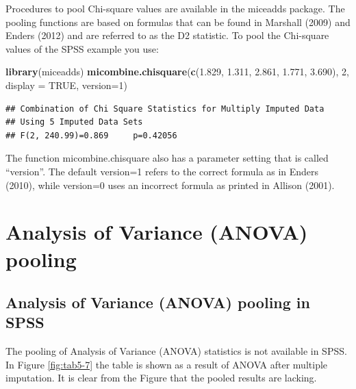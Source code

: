 \documentclass[]{book}
\newenvironment{Shaded}{\begin{snugshade}}{\end{snugshade}}
\newcommand{\KeywordTok}[1]{\textcolor[rgb]{0.13,0.29,0.53}{\textbf{#1}}}
\newcommand{\DataTypeTok}[1]{\textcolor[rgb]{0.13,0.29,0.53}{#1}}
\newcommand{\DecValTok}[1]{\textcolor[rgb]{0.00,0.00,0.81}{#1}}
\newcommand{\FloatTok}[1]{\textcolor[rgb]{0.00,0.00,0.81}{#1}}
\newcommand{\OtherTok}[1]{\textcolor[rgb]{0.56,0.35,0.01}{#1}}
\newcommand{\NormalTok}[1]{#1}
\begin{document}
Procedures to pool Chi-square values are available in the miceadds
package. The pooling functions are based on formulas that can be found
in Marshall (2009) and Enders (2012) and are referred to as the D2
statistic. To pool the Chi-square values of the SPSS example you use:

\begin{Shaded}
\begin{Highlighting}[]
\KeywordTok{library}\NormalTok{(miceadds)}
\KeywordTok{micombine.chisquare}\NormalTok{(}\KeywordTok{c}\NormalTok{(}\FloatTok{1.829}\NormalTok{, }\FloatTok{1.311}\NormalTok{, }\FloatTok{2.861}\NormalTok{, }\FloatTok{1.771}\NormalTok{, }\FloatTok{3.690}\NormalTok{), }\DecValTok{2}\NormalTok{, }\DataTypeTok{display =} \OtherTok{TRUE}\NormalTok{, }\DataTypeTok{version=}\DecValTok{1}\NormalTok{)}
\end{Highlighting}
\end{Shaded}

\begin{verbatim}
## Combination of Chi Square Statistics for Multiply Imputed Data
## Using 5 Imputed Data Sets
## F(2, 240.99)=0.869     p=0.42056
\end{verbatim}

The function micombine.chisquare also has a parameter setting that is
called ``version''. The default version=1 refers to the correct formula
as in Enders (2010), while version=0 uses an incorrect formula as
printed in Allison (2001).

\section{Analysis of Variance (ANOVA)
pooling}\label{analysis-of-variance-anova-pooling}

\subsection{Analysis of Variance (ANOVA) pooling in
SPSS}\label{analysis-of-variance-anova-pooling-in-spss}

The pooling of Analysis of Variance (ANOVA) statistics is not available
in SPSS. In Figure \ref{fig:tab5-7} the table is shown as a result of
ANOVA after multiple imputation. It is clear from the Figure that the
pooled results are lacking.
\end{document}

